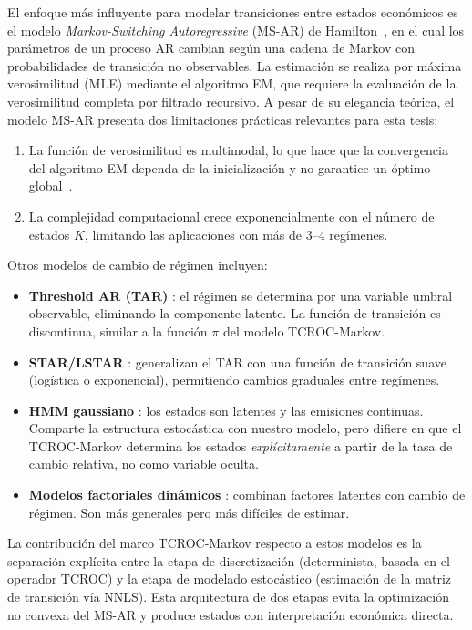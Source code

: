 El enfoque más influyente para modelar transiciones entre estados
económicos es el modelo \textit{Markov-Switching Autoregressive}
(MS-AR) de Hamilton~\cite{hamilton1989new, Hamilton1994}, en el cual
los parámetros de un proceso AR cambian según una cadena de Markov
con probabilidades de transición no observables.  La estimación se
realiza por máxima verosimilitud (MLE) mediante el algoritmo EM,
que requiere la evaluación de la verosimilitud completa por
filtrado recursivo.  A pesar de su elegancia teórica, el modelo
MS-AR presenta dos limitaciones prácticas relevantes para esta
tesis:
\begin{enumerate}
  \item La función de verosimilitud es multimodal, lo que hace que la
    convergencia del algoritmo EM dependa de la inicialización y no
    garantice un óptimo global~\cite{Hamilton1994}.
  \item La complejidad computacional crece exponencialmente con el
    número de estados $K$, limitando las aplicaciones con más de
    3--4 regímenes.
\end{enumerate}

Otros modelos de cambio de régimen incluyen:
\begin{itemize}
  \item \textbf{Threshold AR (TAR)} \cite{Tong1990, Tsay2005}: el
    régimen se determina por una variable umbral observable,
    eliminando la componente latente.  La función de transición es
    discontinua, similar a la función $\pi$ del modelo TCROC-Markov.
  \item \textbf{STAR/LSTAR} \cite{Terasvirta1994}: generalizan el
    TAR con una función de transición suave (logística o
    exponencial), permitiendo cambios graduales entre regímenes.
  \item \textbf{HMM gaussiano} \cite{rabiner1989tutorial}: los
    estados son latentes y las emisiones continuas.  Comparte la
    estructura estocástica con nuestro modelo, pero difiere en que
    el TCROC-Markov determina los estados \emph{explícitamente}
    a partir de la tasa de cambio relativa, no como variable
    oculta.
  \item \textbf{Modelos factoriales dinámicos}
    \cite{KimNelson1999}: combinan factores latentes con cambio de
    régimen.  Son más generales pero más difíciles de estimar.
\end{itemize}

La contribución del marco TCROC-Markov respecto a estos modelos es
la separación explícita entre la etapa de discretización
(determinista, basada en el operador TCROC) y la etapa de modelado
estocástico (estimación de la matriz de transición vía NNLS).  Esta
arquitectura de dos etapas evita la optimización no convexa del
MS-AR y produce estados con interpretación económica directa.

